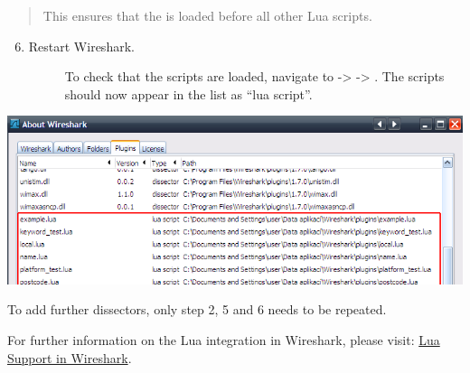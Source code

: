 \documentclass[A4paper,10pt,english]{sphinxmanual}
\begin{document}
\begin{quote}

This ensures that the  is loaded before all other Lua scripts.
\end{quote}
\begin{enumerate}
\setcounter{enumi}{5}
\item {} \begin{description}
\item[{Restart Wireshark.}] \leavevmode
To check that the scripts are loaded, navigate to  -\textgreater{}  -\textgreater{} . The scripts should now appear in the list as ``lua script''.

\end{description}

\end{enumerate}

{\hfill\includegraphics[width=\textwidth]{img/ws_about_plugins.png}\hfill}

To add further dissectors, only step 2, 5 and 6 needs to be repeated.

For further information on the Lua integration in Wireshark, please visit:
\href{http://www.wireshark.org/docs/wsug\_html\_chunked/wsluarm.html}{Lua Support in Wireshark}.
\end{document}
